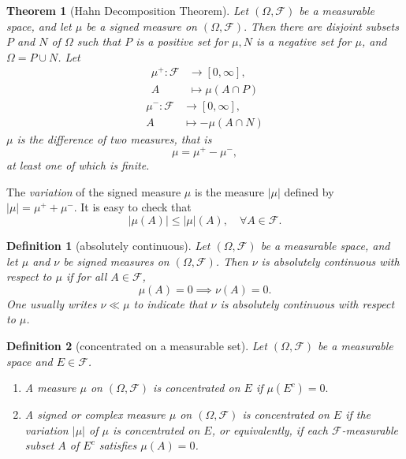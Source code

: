 \documentclass{report}
\newtheorem{definition}{Definition}[section]
\newtheorem{theorem}{Theorem}[section]
\theoremstyle{nonumberplain}
\begin{document}
\begin{theorem}[Hahn Decomposition Theorem]
	Let $(\Omega, \mathcal{F})$ be a measurable space, and let $\mu$ be a signed measure on $(\Omega, \mathcal{F}) .$ Then there are disjoint subsets $P$ and $N$ of $\Omega$ such that $P$ is a positive set for $\mu, N$ is a negative set for $\mu$, and $\Omega=P \cup N$. Let
	\begin{align*}
		\mu^+:\mathcal{F}&\longrightarrow [0,\infty],\\
		A &\longmapsto\mu(A\cap P)
	\end{align*}
	\begin{align*}
		\mu^-:\mathcal{F}&\longrightarrow [0,\infty],\\
		A &\longmapsto-\mu(A\cap N)
	\end{align*}
	$\mu$ is the difference of two measures, that is
	\[
	\mu=\mu^+-\mu^-,
	\]
	at least one of which is finite.
\end{theorem} 

The \emph{variation} of the signed measure $\mu$ is the measure $|\mu|$ defined by $|\mu|=\mu^{+}+\mu^{-}$. It is easy to check that
\[
|\mu(A)| \leq|\mu|(A),\quad\forall A\in\mathcal{F}.
\]

\begin{definition}[absolutely continuous]
Let $(\Omega, \mathcal{F})$ be a measurable space, and let $\mu$ and $\nu$ be signed measures on $(\Omega, \mathcal{F})$. Then $\nu$ is \emph{absolutely continuous} with respect to $\mu$ if for all $A\in\mathcal{F}$,
\[
\mu(A)=0\implies \nu(A)=0.
\]
One usually writes $\nu \ll \mu$ to indicate that $\nu$ is absolutely continuous with respect to $\mu$.
\end{definition}

\begin{definition}[concentrated on a measurable set]
	Let $(\Omega, \mathcal{F})$ be a measurable space and $E\in\mathcal{F}$.
	\begin{enumerate}
		\item A measure $\mu$ on $(\Omega, \mathcal{F})$ is \emph{concentrated on} $E$ if $\mu\left(E^{c}\right)=0 .$ 
		\item A signed or complex measure $\mu$ on $(\Omega, \mathcal{F})$ is \emph{concentrated on} $E$ if the variation $|\mu|$ of $\mu$ is concentrated on $E$, or equivalently, if each $\mathcal{F}$-measurable subset $A$ of $E^{c}$ satisfies $\mu(A)=0$.
	\end{enumerate}
\end{definition}
\end{document}

